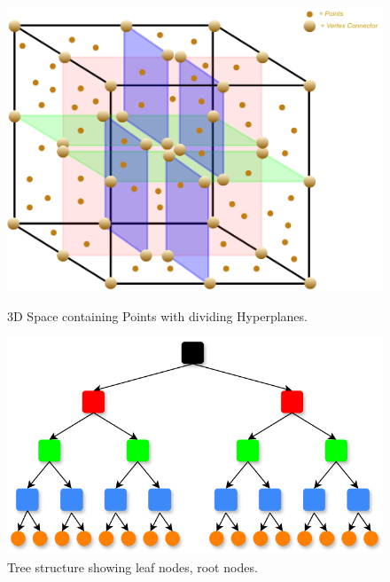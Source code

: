 \begin{figure}[htbp]
    \centering
    \begin{minipage}[b]{0.45\textwidth}
    \centering
    \includegraphics[width=1\linewidth]{97_graphics/related_work/kdtree_cube.pdf}
    \caption{3D Space containing Points with dividing Hyperplanes.}
    \label{fig:related_work-kdtree}
    \end{minipage}
    \hfill
    \begin{minipage}[b]{0.45\textwidth}
    \centering
    \includegraphics[width=1\linewidth]{97_graphics/related_work/kdtree_tree.pdf}
    \caption{Tree structure showing leaf nodes, root nodes.}
    \label{fig:related_work-search_tree}
    \end{minipage}
\end{figure}

